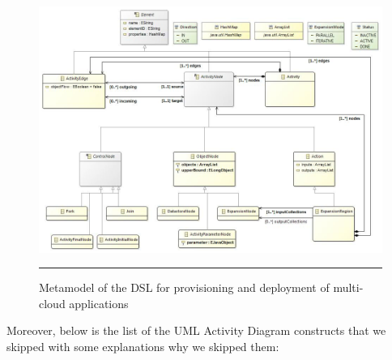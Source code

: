 \noindent 

\begin{figure}[htbp]
	\centering
		\includegraphics[width=38em]{./Figures/UML_Activity_mine_class_diagram}
		\rule{38em}{0.5pt}
	\caption[DSL Metamodel]{Metamodel of the DSL for provisioning and deployment of multi-cloud applications}
	\label{fig:Metamodel}
\end{figure}

\noindent 

\noindent Moreover, below is the list of the UML Activity Diagram constructs that we skipped with some explanations why we skipped them:

